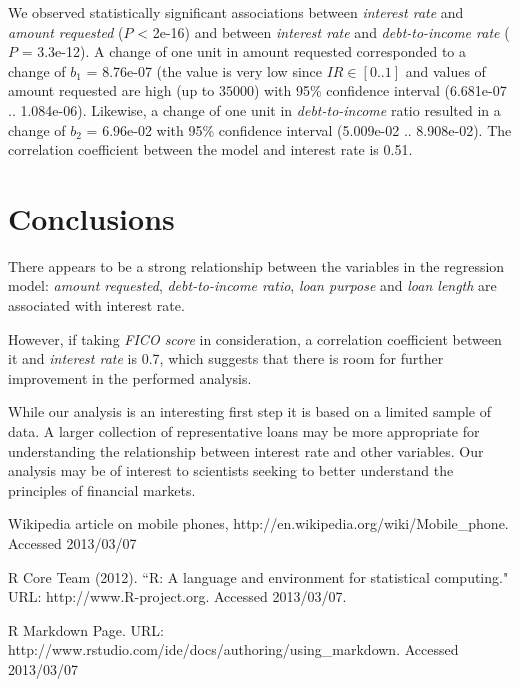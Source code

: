 \documentclass[a4paper,12pt]{extarticle}
\begin{document}
We observed statistically significant associations between \emph{interest rate} and \emph{amount requested} ($P$ < 2e-16) and between \emph{interest rate} and \emph{debt-to-income rate} ($P$ = 3.3e-12). A change of one unit in amount requested corresponded to a change of $b_1$ = 8.76e-07 (the value is very low since $IR \in [0..1]$ and values of amount requested are high (up to $35 000$) with 95\% confidence interval (6.681e-07 .. 1.084e-06). Likewise, a change of one unit in \emph{debt-to-income} ratio resulted in a change of $b_2$ = 6.96e-02 with 95\% confidence interval (5.009e-02 .. 8.908e-02). The correlation coefficient between the model and interest rate is 0.51.


\section{Conclusions}

There appears to be a strong relationship between the variables in the regression model: \emph{amount requested}, \emph{debt-to-income ratio}, \emph{loan purpose} and \emph{loan length} are associated with interest rate.

However, if taking \emph{FICO score} in consideration, a correlation coefficient between it and \emph{interest rate} is 0.7, which suggests that there is room for further improvement in the performed analysis.

While our analysis is an interesting first step it is based on a limited sample of data. A larger collection of representative loans may be more appropriate for understanding the relationship between interest rate and other variables. Our analysis may be of interest to scientists seeking to better understand the principles of financial markets.

\newpage


\begin{thebibliography}{9}

  Wikipedia article on mobile phones, http://en.wikipedia.org/wiki/Mobile\_phone. Accessed 2013/03/07

  R Core Team (2012). ``R: A language and environment for statistical computing." URL: http://www.R-project.org. Accessed 2013/03/07.

  R Markdown Page. URL: http://www.rstudio.com/ide/docs/authoring/using\_markdown. Accessed 2013/03/07



\end{thebibliography}
\end{document}
